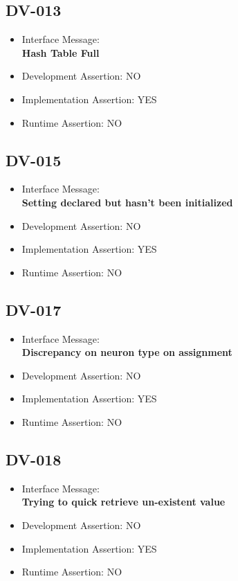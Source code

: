 \subsection{DV-013}
\begin{itemize}
  \item Interface Message:\\[1em]\textbf{Hash Table Full}
  \item Development Assertion: NO
  \item Implementation Assertion: YES
  \item Runtime Assertion: NO
\end{itemize}

\subsection{DV-015}
\begin{itemize}
  \item Interface Message:\\[1em]\textbf{Setting declared but hasn't been initialized}
  \item Development Assertion: NO
  \item Implementation Assertion: YES
  \item Runtime Assertion: NO
\end{itemize}

\subsection{DV-017}
\begin{itemize}
  \item Interface Message:\\[1em]\textbf{Discrepancy on neuron type on assignment}
  \item Development Assertion: NO
  \item Implementation Assertion: YES
  \item Runtime Assertion: NO
\end{itemize}

\subsection{DV-018}
\begin{itemize}
  \item Interface Message:\\[1em]\textbf{Trying to quick retrieve un-existent value}
  \item Development Assertion: NO
  \item Implementation Assertion: YES
  \item Runtime Assertion: NO
\end{itemize}


